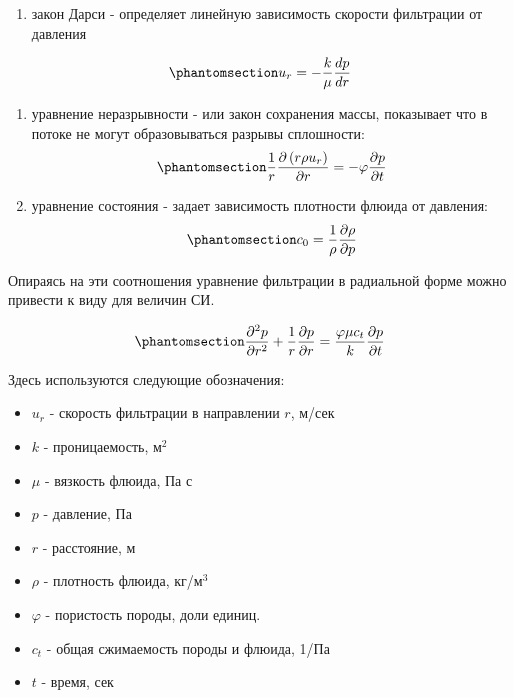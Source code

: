 \documentclass[
  russian,
  letterpaper,
  DIV=11,
  numbers=noendperiod,
  oneside]{scrartcl}
\providecommand{\tightlist}{%
  \setlength{\itemsep}{0pt}\setlength{\parskip}{0pt}}
\begin{document}
\begin{enumerate}
\def\labelenumi{\arabic{enumi}.}
\tightlist
\item
  закон Дарси - определяет линейную зависимость скорости фильтрации от
  давления
\end{enumerate}

\begin{equation}\phantomsection\label{eq-darcy_law_1}{ 
u_r=-\frac{k}{\mu}\frac{dp}{dr} 
}\end{equation}

\begin{enumerate}
\def\labelenumi{\arabic{enumi}.}
\setcounter{enumi}{1}
\item
  уравнение неразрывности - или закон сохранения массы, показывает что в
  потоке не могут образовываться разрывы сплошности:
  \begin{equation}\phantomsection\label{eq-mass_balance_1}{  
  \frac{1}{r}\frac{\partial\left(r\rho u_r\right)}{\partial r}=-\varphi\frac{\partial p}{\partial t} 
  }\end{equation}
\item
  уравнение состояния - задает зависимость плотности флюида от давления:
  \begin{equation}\phantomsection\label{eq-eos_1}{   
  c_0=\frac{1}{\rho}\frac{\partial\rho}{\partial p} 
  }\end{equation}
\end{enumerate}

Опираясь на эти соотношения уравнение фильтрации в радиальной форме
можно привести к виду для величин СИ.

\begin{equation}\phantomsection\label{eq-diff_eq_1}{ 
    \frac{\partial ^2 p }{\partial r^2} + \frac{1}{r} \frac{\partial p}{\partial r} = \frac{\varphi \mu c_t}{k} \frac{\partial p}{\partial t} 
}\end{equation}

Здесь используются следующие обозначения:

\begin{itemize}
\tightlist
\item
  \(u_r\) - скорость фильтрации в направлении \(r\), м/сек
\item
  \(k\) - проницаемость, м\(^2\)
\item
  \(\mu\) - вязкость флюида, Па с
\item
  \(p\) - давление, Па
\item
  \(r\) - расстояние, м
\item
  \(\rho\) - плотность флюида, кг/м\(^3\)
\item
  \(\varphi\) - пористость породы, доли единиц.
\item
  \(c_t\) - общая сжимаемость породы и флюида, 1/Па
\item
  \(t\) - время, сек
\end{itemize}
\end{document}
